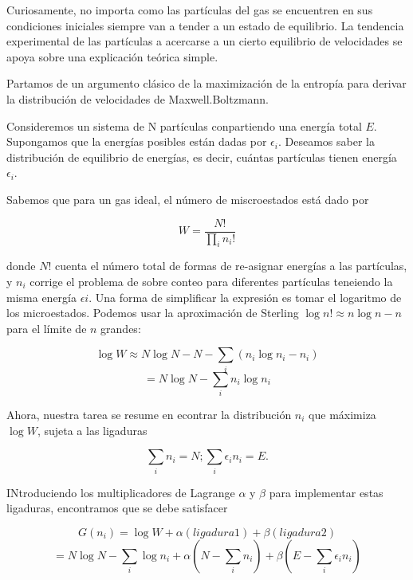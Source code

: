 \documentclass[11pt]{article}
\begin{document}
Curiosamente, no importa como las partículas del gas se encuentren en sus condiciones iniciales siempre van a tender a un estado de equilibrio. La tendencia experimental de las partículas a acercarse a un cierto equilibrio de velocidades se apoya sobre una explicación teórica simple.

Partamos de un argumento clásico de la maximización de la entropía para derivar la distribución de velocidades de Maxwell.Boltzmann. 

Consideremos un sistema de N partículas conpartiendo una energía total $E$. Supongamos que la energías posibles están dadas por $\epsilon_{i}$. Deseamos saber la distribución de equilibrio de energías, es decir, cuántas partículas tienen energía $\epsilon_{i}$.

Sabemos que para un gas ideal, el número de miscroestados está dado por 

\begin{equation}
    W = \dfrac{N!}{\prod_{i}n_{i}!}
\end{equation}

donde $N!$ cuenta el número total de formas de re-asignar energías a las partículas, y $n_{i}$ corrige el problema de sobre conteo para diferentes partículas teneiendo la misma energía $\epsilon{i}$. Una forma de simplificar la expresión es tomar el logaritmo de los microestados. Podemos usar la aproximación de Sterling $\log n! \approx n\log n- n$ para el límite de $n$ grandes:

\begin{equation}
    \log W \approx N\log N - N -\sum_{i}(n_{i}\log n_{i} - n_{i}) 
\end{equation}
\begin{equation}
    = N\log N - \sum_{i}n_{i}\log n_{i}
\end{equation}

Ahora, nuestra tarea se resume en econtrar la distribución {$n_{i}$} que máximiza $\log W$, sujeta a las ligaduras 

\begin{equation*}
    \sum_{i}n_{i} = N; \sum_{i}\epsilon_{i}n_{i} = E.
\end{equation*}

INtroduciendo los multiplicadores de Lagrange $\alpha$ y $\beta$ para implementar estas ligaduras, encontramos que se debe satisfacer 

\begin{equation*}
    G({n_{i}}) = \log W + \alpha(ligadura 1) + \beta(ligadura 2)
\end{equation*}
\begin{equation}
    = N\log N - \sum_{i}\log n_{i} + \alpha(N - \sum_{i}n_{i}) + \beta(E - \sum_{i}\epsilon_{i}n_{i})
\end{equation}
\end{document}
